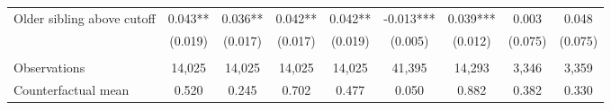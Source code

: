 {{\begin{tabular}{lcccccccc}
Older sibling above cutoff&       0.043** &       0.036** &       0.042** &       0.042** &      -0.013***&       0.039***&       0.003   &       0.048   \\
                    &     (0.019)   &     (0.017)   &     (0.017)   &     (0.019)   &     (0.005)   &     (0.012)   &     (0.075)   &     (0.075)   \\
                    &               &               &               &               &               &               &               &               \\
Observations        &      14,025   &      14,025   &      14,025   &      14,025   &      41,395   &      14,293   &       3,346   &       3,359   \\
Counterfactual mean &       0.520   &       0.245   &       0.702   &       0.477   &       0.050   &       0.882   &       0.382   &       0.330   \\
 

\bottomrule
\end{tabular}
}
}
